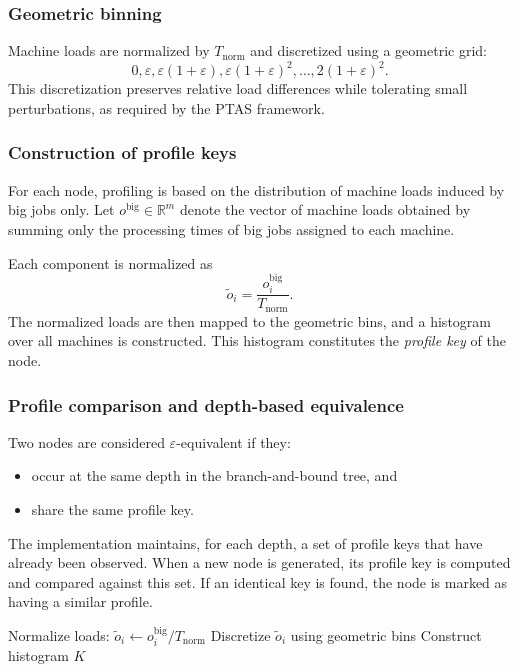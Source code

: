 \subsubsection{Geometric binning}

Machine loads are normalized by \(T_{\text{norm}}\) and discretized using a geometric grid:
\[
  0, \varepsilon, \varepsilon(1+\varepsilon), \varepsilon(1+\varepsilon)^2, \dots, 2(1+\varepsilon)^2.
\]
This discretization preserves relative load differences while tolerating small perturbations, as required by the PTAS framework.

\subsubsection{Construction of profile keys}
\label{subsec:profile-keys}

For each node, profiling is based on the distribution of machine loads induced by big jobs only.
Let \(o^{\text{big}} \in \mathbb{R}^m\) denote the vector of machine loads obtained by summing only the processing times of big jobs assigned to each machine.

Each component is normalized as
\[
  \tilde{o}_i = \frac{o^{\text{big}}_i}{T_{\text{norm}}}.
\]
The normalized loads are then mapped to the geometric bins, and a histogram over all machines is constructed.
This histogram constitutes the \emph{profile key} of the node.

\subsubsection{Profile comparison and depth-based equivalence}
\label{subsec:profile-comparison}

Two nodes are considered \(\varepsilon\)-equivalent if they:
\begin{itemize}
  \item occur at the same depth in the branch-and-bound tree, and
  \item share the same profile key.
\end{itemize}

The implementation maintains, for each depth, a set of profile keys that have already been observed.
When a new node is generated, its profile key is computed and compared against this set.
If an identical key is found, the node is marked as having a similar profile.

\begin{algorithm}[H]
\caption{Profiling and equivalence detection}
\label{alg:profiling}

Normalize loads: $\tilde{o}_i \gets o^{\text{big}}_i / T_{\text{norm}}$\;
Discretize $\tilde{o}_i$ using geometric bins\;
Construct histogram $K$\;


\end{algorithm}

